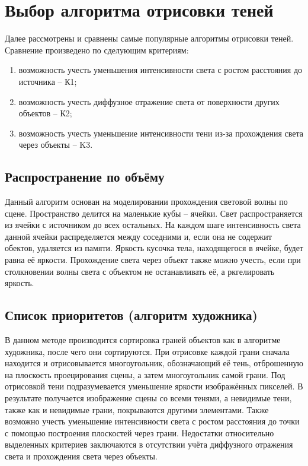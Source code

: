 \section{Выбор алгоритма отрисовки теней} {
    Далее рассмотрены и сравнены самые популярные алгоритмы отрисовки теней.
    Сравнение произведено по сделующим критериям:
    \begin{enumerate}
        \item возможность учесть уменьшения интенсивности света с ростом расстояния
        до источника -- К1;
        \item возможность учесть диффузное отражение света
        от поверхности других объектов -- К2;
        \item возможность учесть уменьшение интенсивности тени из-за
        прохождения света через объекты -- K3.
    \end{enumerate}
    
    \subsection{Распространение по объёму} {
        \hspace{1.25cm}
        Данный алгоритм основан на моделировании прохождения световой волны по сцене.
        Пространство делится на маленькие кубы -- ячейки.
        Свет распространяется из ячейки с источником до всех остальных.
        На каждом шаге интенсивность света данной ячейки распределяется между
        соседними и, если она не содержит обектов, удаляется из памяти.
        Яркость кусочка тела, находящегося в ячейке, будет равна её яркости.
        Прохождение света через объект также можно учесть, если при столкновении волны света с объектом не останавливать её, а ркгелировать яркость.
    }
    \subsection{Список приоритетов (алгоритм художника)} {
        \hspace{1.25cm}
        В данном методе производится сортировка граней объектов
        как в алгоритме художника, после чего они сортируются.
        При отрисовке каждой грани сначала находится и отрисовывается
        многоугольник, обозначающий её тень, отброшенную на плоскость
        проецирования сцены, а затем многоугольник самой грани.
        Под отрисовкой тени подразумевается уменьшение яркости изображённых пикселей.
        В результате получается изображение сцены со всеми тенями, а невидимые тени,
        также как и невидимые грани, покрываются другими элементами.
        Также возможно учесть уменьшение интенсивности света с ростом
        расстояния до точки с помощью построения плоскостей через грани.
        Недостатки относительно выделенных критериев заключаются в отсутствии учёта
        диффузного отражения света и прохождения света через объекты.
    }
}
